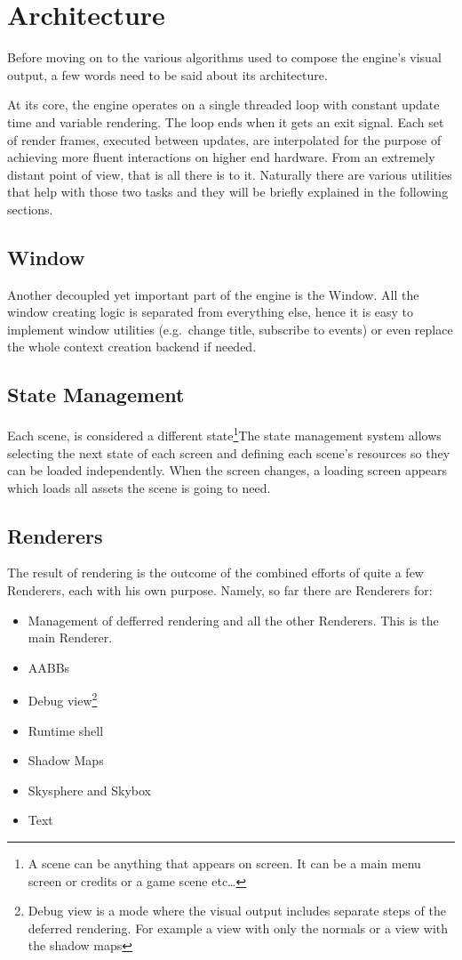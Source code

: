 \section{Architecture}
Before moving on to the various algorithms used to compose the engine's visual output, a few
words need to be said about its architecture.

At its core, the engine operates on a single threaded loop with constant update time and
variable rendering. The loop ends when it gets an exit signal. Each set of render frames,
executed between updates, are interpolated for the purpose of achieving more fluent interactions
on higher end hardware. From an extremely distant point of view, that is all there is to it.
Naturally there are various utilities that help with those two tasks and they will be briefly
explained in the following sections.

\subsection{Window}
Another decoupled yet important part of the engine is the Window. All the window creating logic
is separated from everything else, hence it is easy to implement window utilities (e.g.\ change
title, subscribe to events) or even replace the whole context creation backend if needed.

\subsection{State Management}
Each scene, is considered a different state\footnote{A scene can be anything that appears on
screen. It can be a main menu screen or credits or a game scene etc\dots}The state management
system allows selecting the next state of each screen and defining each scene's resources
so they can be loaded independently. When the screen changes, a loading screen appears which loads
all assets the scene is going to need.

\subsection{Renderers}
The result of rendering is the outcome of the combined efforts of quite a few Renderers, each
with his own purpose. Namely, so far there are Renderers for:

\begin{itemize}
\item Management of defferred rendering and all the other Renderers. This is the main Renderer.
\item AABBs
\item Debug view\footnote{Debug view is a mode where the visual output includes separate steps
      of the deferred rendering. For example a view with only the normals or a view with the
      shadow maps}
\item Runtime shell
\item Shadow Maps
\item Skysphere and Skybox
\item Text
\end{itemize}

